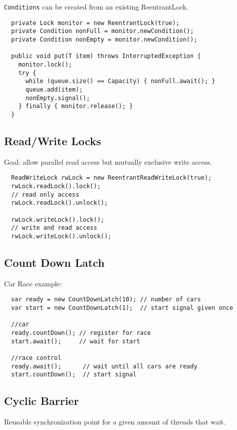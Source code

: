 \texttt{Conditions} can be created from an existing ReentrantLock.

\begin{verbatim}
  private Lock monitor = new ReentrantLock(true);
  private Condition nonFull = monitor.newCondition();
  private Condition nonEmpty = monitor.newCondition();

  public void put(T item) throws InterruptedException {
    monitor.lock();
    try {
      while (queue.size() == Capacity) { nonFull.await(); }
      queue.add(item);
      nonEmpty.signal();
    } finally { monitor.release(); }
  }
\end{verbatim}

\subsection{Read/Write Locks}

Goal: allow parallel read access but mutually exclusive write access.

\begin{verbatim}
  ReadWriteLock rwLock = new ReentrantReadWriteLock(true);
  rwLock.readLock().lock();
  // read only access
  rwLock.readLock().unlock();

  rwLock.writeLock().lock();
  // write and read access
  rwLock.writeLock().unlock();
\end{verbatim}

\subsection{Count Down Latch}
Car Race example:

\begin{verbatim}
  var ready = new CountDownLatch(10); // number of cars
  var start = new CountDownLatch(1);  // start signal given once

  //car
  ready.countDown(); // register for race
  start.await();     // wait for start

  //race control
  ready.await();      // wait until all cars are ready
  start.countDown();  // start signal
\end{verbatim}

\subsection{Cyclic Barrier}

Reusable synchronization point for a given amount of threads that wait.

